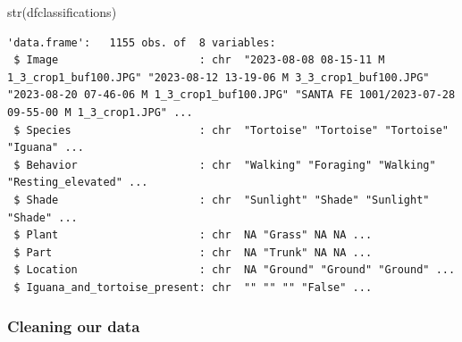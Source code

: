 \documentclass[
  letterpaper,
  DIV=11,
  numbers=noendperiod]{scrartcl}
\newenvironment{Shaded}{\begin{snugshade}}{\end{snugshade}}
\newcommand{\FunctionTok}[1]{\textcolor[rgb]{0.28,0.35,0.67}{#1}}
\newcommand{\NormalTok}[1]{\textcolor[rgb]{0.00,0.23,0.31}{#1}}
\begin{document}
\begin{Shaded}
\begin{Highlighting}[]
\FunctionTok{str}\NormalTok{(dfclassifications)}
\end{Highlighting}
\end{Shaded}

\begin{verbatim}
'data.frame':   1155 obs. of  8 variables:
 $ Image                      : chr  "2023-08-08 08-15-11 M 1_3_crop1_buf100.JPG" "2023-08-12 13-19-06 M 3_3_crop1_buf100.JPG" "2023-08-20 07-46-06 M 1_3_crop1_buf100.JPG" "SANTA FE 1001/2023-07-28 09-55-00 M 1_3_crop1.JPG" ...
 $ Species                    : chr  "Tortoise" "Tortoise" "Tortoise" "Iguana" ...
 $ Behavior                   : chr  "Walking" "Foraging" "Walking" "Resting_elevated" ...
 $ Shade                      : chr  "Sunlight" "Shade" "Sunlight" "Shade" ...
 $ Plant                      : chr  NA "Grass" NA NA ...
 $ Part                       : chr  NA "Trunk" NA NA ...
 $ Location                   : chr  NA "Ground" "Ground" "Ground" ...
 $ Iguana_and_tortoise_present: chr  "" "" "" "False" ...
\end{verbatim}

\subsubsection{Cleaning our data}\label{cleaning-our-data}
\end{document}
